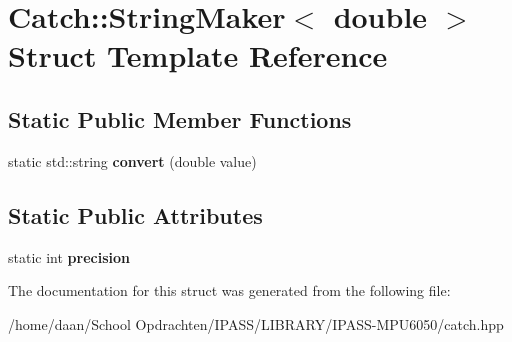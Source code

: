\hypertarget{structCatch_1_1StringMaker_3_01double_01_4}{}\section{Catch\+:\+:String\+Maker$<$ double $>$ Struct Template Reference}
\label{structCatch_1_1StringMaker_3_01double_01_4}
\subsection*{Static Public Member Functions}
\begin{DoxyCompactItemize}
\item 
\mbox{\label{structCatch_1_1StringMaker_3_01double_01_4_acaa61529acad2462292c747d34e5f3d2}} 
static std\+::string {\bfseries convert} (double value)
\end{DoxyCompactItemize}
\subsection*{Static Public Attributes}
\begin{DoxyCompactItemize}
\item 
\mbox{\label{structCatch_1_1StringMaker_3_01double_01_4_a15fa2b093c532ece7f1d0c713ebaee67}} 
static int {\bfseries precision}
\end{DoxyCompactItemize}


The documentation for this struct was generated from the following file\+:\begin{DoxyCompactItemize}
\item 
/home/daan/\+School Opdrachten/\+I\+P\+A\+S\+S/\+L\+I\+B\+R\+A\+R\+Y/\+I\+P\+A\+S\+S-\/\+M\+P\+U6050/catch.\+hpp\end{DoxyCompactItemize}
